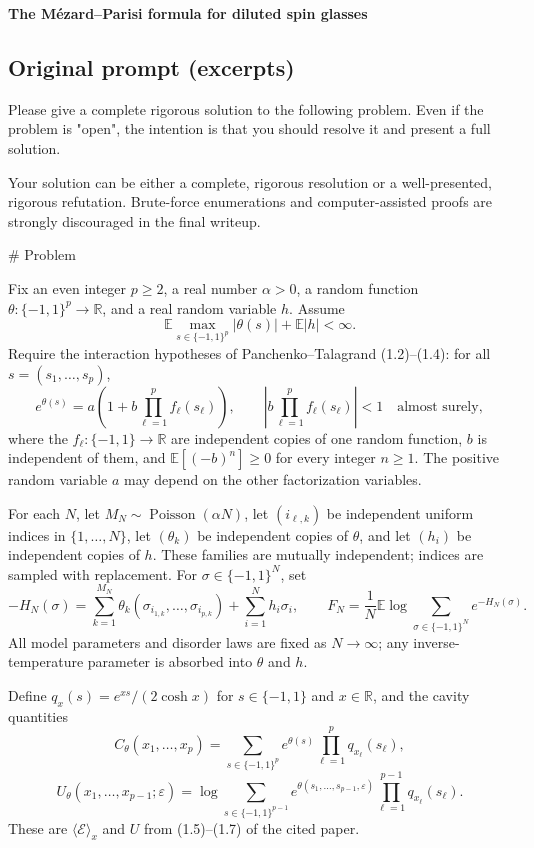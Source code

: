 \documentclass[11pt,letterpaper]{article}
\begin{document}
{\raggedright\LARGE\sffamily\bfseries\color{ink}The Mézard--Parisi formula for diluted spin glasses\par}
\medskip
\subsection*{Original prompt (excerpts)}
\begin{PromptQuote}
Please give a complete rigorous solution to the following problem. Even if the problem is "open", the intention is that you should resolve it and present a full solution.

Your solution can be either a complete, rigorous resolution or a well-presented, rigorous refutation. Brute-force enumerations and computer-assisted proofs are strongly discouraged in the final writeup.

# Problem

Fix an even integer $p\ge2$, a real number $\alpha>0$, a random function $\theta:\{-1,1\}^p\to\mathbb R$, and a real random variable $h$. Assume
$$
\mathbb E\max_{s\in\{-1,1\}^p}|\theta(s)|+\mathbb E|h|<\infty.
$$
Require the interaction hypotheses of Panchenko--Talagrand (1.2)--(1.4): for all $s=(s_1,\ldots,s_p)$,
$$
e^{\theta(s)}=a\left(1+b\prod_{\ell=1}^p f_\ell(s_\ell)\right),\qquad
\left|b\prod_{\ell=1}^p f_\ell(s_\ell)\right|<1\quad\text{almost surely},
$$
where the $f_\ell:\{-1,1\}\to\mathbb R$ are independent copies of one random function, $b$ is independent of them, and $\mathbb E[(-b)^n]\ge0$ for every integer $n\ge1$. The positive random variable $a$ may depend on the other factorization variables.

For each $N$, let $M_N\sim\operatorname{Poisson}(\alpha N)$, let $(i_{\ell,k})$ be independent uniform indices in $\{1,\ldots,N\}$, let $(\theta_k)$ be independent copies of $\theta$, and let $(h_i)$ be independent copies of $h$. These families are mutually independent; indices are sampled with replacement. For $\sigma\in\{-1,1\}^N$, set
$$
-H_N(\sigma)=\sum_{k=1}^{M_N}\theta_k(\sigma_{i_{1,k}},\ldots,\sigma_{i_{p,k}})+\sum_{i=1}^N h_i\sigma_i,\qquad
F_N=\frac1N\mathbb E\log\sum_{\sigma\in\{-1,1\}^N}e^{-H_N(\sigma)}.
$$
All model parameters and disorder laws are fixed as $N\to\infty$; any inverse-temperature parameter is absorbed into $\theta$ and $h$.

Define $q_x(s)=e^{xs}/(2\cosh x)$ for $s\in\{-1,1\}$ and $x\in\mathbb R$, and the cavity quantities
$$
C_\theta(x_1,\ldots,x_p)=\sum_{s\in\{-1,1\}^p}e^{\theta(s)}\prod_{\ell=1}^p q_{x_\ell}(s_\ell),
$$
$$
U_\theta(x_1,\ldots,x_{p-1};\varepsilon)=\log\sum_{s\in\{-1,1\}^{p-1}}e^{\theta(s_1,\ldots,s_{p-1},\varepsilon)}\prod_{\ell=1}^{p-1}q_{x_\ell}(s_\ell).
$$
These are $\langle\mathcal E\rangle_x$ and $U$ from (1.5)--(1.7) of the cited paper.


\end{PromptQuote}
\end{document}
